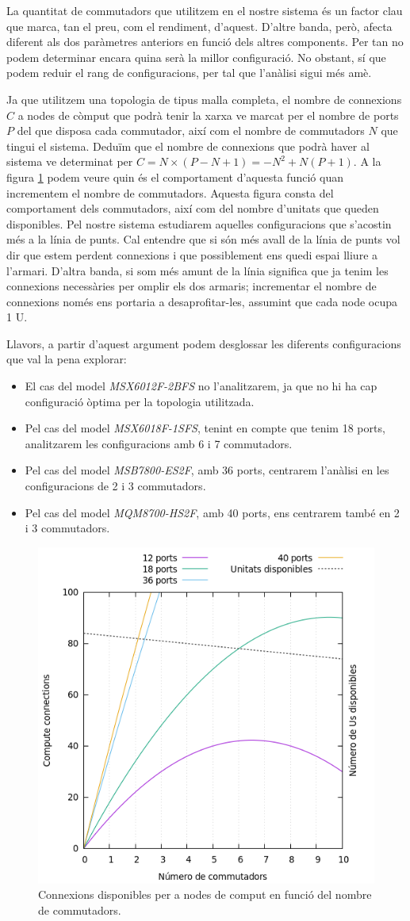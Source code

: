 La quantitat de commutadors que utilitzem en el nostre sistema és un factor clau que marca,
tan el preu, com el rendiment, d'aquest. D'altre banda, però, afecta diferent als dos paràmetres
anteriors en funció dels altres components. Per tan no podem determinar encara quina serà la
millor configuració. No obstant, sí que podem reduir el rang de configuracions, per tal que
l'anàlisi sigui més amè.

Ja que utilitzem una topologia de tipus malla completa, el nombre de connexions $C$ a nodes de còmput
que podrà tenir la xarxa ve marcat per el nombre de ports $P$ del que disposa cada commutador, així
com el nombre de commutadors $N$ que tingui el sistema. Deduïm que el nombre de connexions
que podrà haver al sistema ve determinat per $C = N \times ( P - N + 1 ) = -N^2 + N(P+1)$.
A la figura \ref{fig:connections} podem veure quin és el comportament d'aquesta funció quan incrementem
el nombre de commutadors. Aquesta figura consta del comportament dels commutadors, així com del nombre 
d'unitats que queden disponibles. Pel nostre sistema estudiarem aquelles configuracions que s'acostin 
més a la línia de punts. Cal entendre que si són més avall de la línia de punts vol dir que estem perdent connexions
i que possiblement ens quedi espai lliure a l'armari. D'altra banda, si som més amunt de la línia 
significa que ja tenim les connexions necessàries per omplir els dos armaris; incrementar el nombre de connexions
només ens portaria a desaprofitar-les, assumint que cada node ocupa 1 U.

Llavors, a partir d'aquest argument podem desglossar les diferents configuracions que val la pena explorar:
\begin{itemize}
  \item El cas del model \textit{MSX6012F-2BFS} no l'analitzarem, ja que no hi ha cap configuració òptima per la topologia utilitzada.
  \item Pel cas del model \textit{MSX6018F-1SFS}, tenint en compte que tenim 18 ports, analitzarem les configuracions amb 6 i 7 commutadors.
  \item Pel cas del model \textit{MSB7800-ES2F}, amb 36 ports, centrarem l'anàlisi en les configuracions de 2 i 3 commutadors.
  \item Pel cas del model \textit{MQM8700-HS2F}, amb 40 ports, ens centrarem també en 2 i 3 commutadors.
\end{itemize}

\begin{figure}[h!]
    \centering
    \includegraphics[width=0.6\linewidth]{img/connections.png}
    \caption{Connexions disponibles per a nodes de comput en funció del nombre de commutadors.}
    
    \label{fig:connections}
\end{figure}

